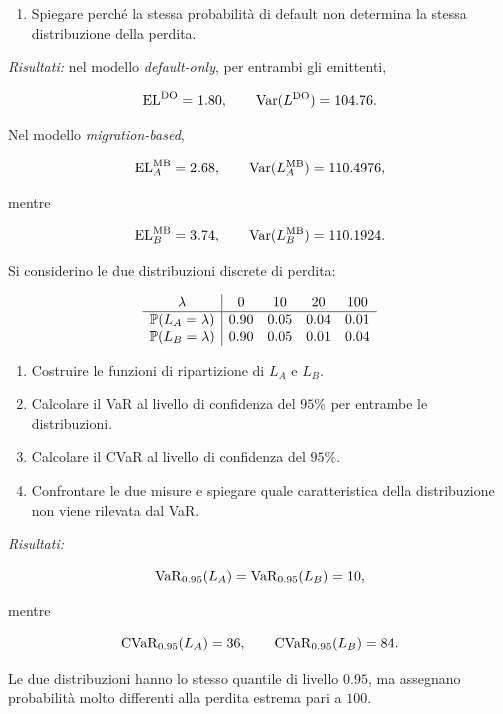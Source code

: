 \begin{exercise}
\begin{enumerate}
\item Spiegare perch\'{e} la stessa probabilit\`{a} di default non
determina la stessa distribuzione della perdita.

\end{enumerate}

\textit{Risultati:} nel modello \emph{default-only}, per entrambi gli
emittenti,

\[
\mathrm{EL}^{\mathrm{DO}}=1.80,
\qquad
\operatorname{Var}(L^{\mathrm{DO}})=104.76.
\]

Nel modello \emph{migration-based},

\[
\mathrm{EL}^{\mathrm{MB}}_A=2.68,
\qquad
\operatorname{Var}(L_A^{\mathrm{MB}})=110.4976,
\]

mentre

\[
\mathrm{EL}^{\mathrm{MB}}_B=3.74,
\qquad
\operatorname{Var}(L_B^{\mathrm{MB}})=110.1924.
\]

\end{exercise}

\begin{exercise}

\label{ex:cap09-stesso-var-diverso-cvar}

Si considerino le due distribuzioni discrete di perdita:

\[
\begin{array}{c|cccc}
\lambda
&
0
&
10
&
20
&
100
\\
\hline
\mathbb{P}(L_A=\lambda)
&
0.90
&
0.05
&
0.04
&
0.01
\\
\mathbb{P}(L_B=\lambda)
&
0.90
&
0.05
&
0.01
&
0.04
\end{array}
\]

\begin{enumerate}

\item Costruire le funzioni di ripartizione di $L_A$ e $L_B$.

\item Calcolare il VaR al livello di confidenza del $95\%$ per entrambe
le distribuzioni.

\item Calcolare il CVaR al livello di confidenza del $95\%$.

\item Confrontare le due misure e spiegare quale caratteristica della
distribuzione non viene rilevata dal VaR.

\end{enumerate}

\textit{Risultati:}

\[
\operatorname{VaR}_{0.95}(L_A)
=
\operatorname{VaR}_{0.95}(L_B)
=
10,
\]

mentre

\[
\operatorname{CVaR}_{0.95}(L_A)=36,
\qquad
\operatorname{CVaR}_{0.95}(L_B)=84.
\]

Le due distribuzioni hanno lo stesso quantile di livello $0.95$, ma
assegnano probabilit\`{a} molto differenti alla perdita estrema pari
a $100$.

\end{exercise}

